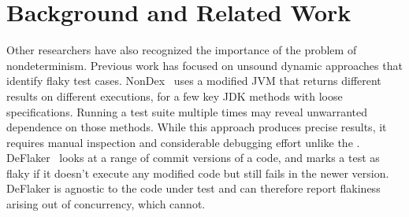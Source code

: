 \section{Background and Related Work\label{sec:related}}
Other researchers have also recognized the importance of the problem of nondeterminism.
Previous work has focused on unsound dynamic
approaches that identify flaky test cases.
NonDex~\cite{ShiGLM2016} uses a modified JVM that returns different results on different
executions, for a few key JDK methods with loose specifications.  Running a
test suite multiple times may reveal unwarranted dependence on those
methods. While this approach produces precise results, it requires manual inspection
and considerable debugging effort unlike the \TheDeterminismChecker.
DeFlaker~\cite{BellLHEYM2018} looks at a range of commit versions
of a code, and marks a test as flaky if it doesn't execute any modified code but still fails in the newer version. DeFlaker is agnostic
to the code under test and can therefore report flakiness arising out of concurrency, which \theDeterminismChecker cannot. 
